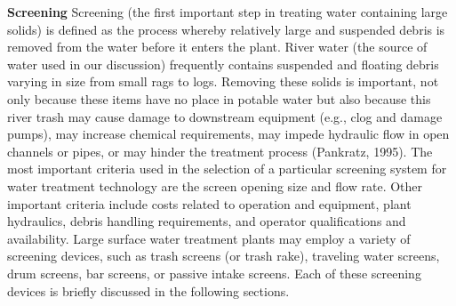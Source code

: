 \documentclass{article}
\begin{document}
\textbf{Screening}
Screening (the first important step in treating water containing large solids) is defined as the process whereby relatively large and suspended debris is removed from the water before it enters the plant. River water (the source of water used in our discussion) frequently contains suspended and floating debris varying in size from small rags to logs. Removing these solids is important, not only because these items have no place in potable water but also because this river trash may cause damage to downstream equipment (e.g., clog and damage pumps), may increase chemical requirements, may impede hydraulic flow in open channels or pipes, or may hinder the treatment process (Pankratz, 1995). The most important criteria used in the selection of a particular screening system for water treatment technology are the screen opening size and flow rate. Other important criteria include costs related to operation and equipment, plant hydraulics, debris handling requirements, and operator qualifications and availability. Large surface water treatment plants may employ a variety of screening devices, such as trash screens (or trash rake), traveling water screens, drum screens, bar screens, or passive intake screens. Each of these screening devices is briefly discussed in the following sections.\\
 
\end{document}
